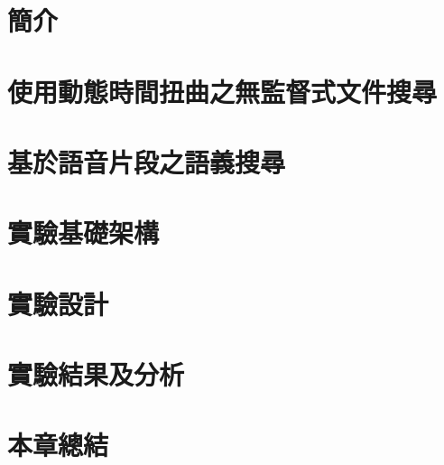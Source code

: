 \section{簡介}

\section{使用動態時間扭曲之無監督式文件搜尋}

\section{基於語音片段之語義搜尋}

\section{實驗基礎架構}

\section{實驗設計}

\section{實驗結果及分析}

\section{本章總結}
